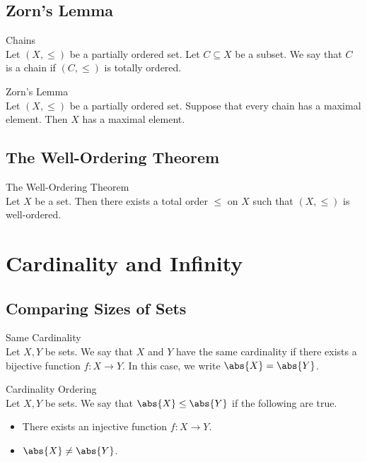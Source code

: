 \documentclass[a4paper]{article}
\begin{document}
\subsection{Zorn's Lemma}
\begin{defn}{Chains}{}\\
Let $(X,\leq)$ be a partially ordered set. Let $C\subseteq X$ be a subset. We say that $C$ is a chain if $(C,\leq)$ is totally ordered. 
\end{defn}

\begin{thm}{Zorn's Lemma}{}\\
Let $(X,\leq)$ be a partially ordered set. Suppose that every chain has a maximal element. Then $X$ has a maximal element. 
\end{thm}

\subsection{The Well-Ordering Theorem}
\begin{thm}{The Well-Ordering Theorem}{}\\
Let $X$ be a set. Then there exists a total order $\leq$ on $X$ such that $(X,\leq)$ is well-ordered. 
\end{thm}


\pagebreak
\section{Cardinality and Infinity}
\subsection{Comparing Sizes of Sets}
\begin{defn}{Same Cardinality}{}\\
Let $X,Y$ be sets. We say that $X$ and $Y$ have the same cardinality if there exists a bijective function $f:X\to Y$. In this case, we write $\abs{X}=\abs{Y}$. 
\end{defn}

\begin{defn}{Cardinality Ordering}{}\\
Let $X,Y$ be sets. We say that $\abs{X}\leq\abs{Y}$ if the following are true. 
\begin{itemize}
\item There exists an injective function $f:X\to Y$. 
\item $\abs{X}\neq\abs{Y}$. 
\end{itemize}
\end{defn}
\end{document}
